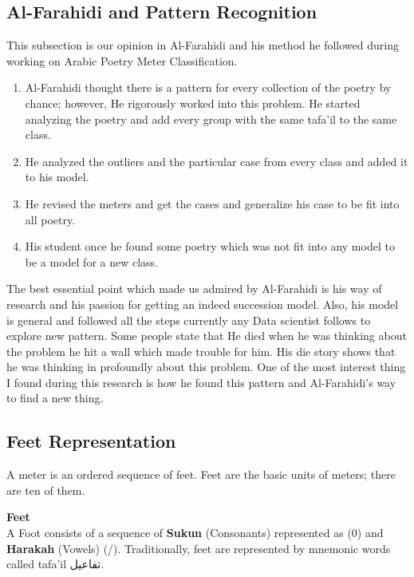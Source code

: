   

  
    
    \subsection{Al-Farahidi and Pattern Recognition}
    This subsection is our opinion in Al-Farahidi and his method he followed during working on Arabic Poetry Meter Classification.

\begin{enumerate}


\item Al-Farahidi thought there is a pattern for every collection of the poetry by chance; however, He rigorously worked into this problem. He started analyzing the poetry and add every group with the same tafa'il to the same class.
\item He analyzed the outliers and the particular case from every class and added it to his model.
\item He revised the meters and get the cases and generalize his case to be fit into all poetry.
\item His student once he found some poetry which was not fit into any model to be a model for a new class.

\end{enumerate}
The best essential point which made us admired by Al-Farahidi is his way of research and his passion for getting an indeed succession model. Also, his model is general and followed all the steps currently any Data scientist follows to explore new pattern. Some people state that He died when he was thinking about the problem he hit a wall which made trouble for him. His die story shows that he was thinking in profoundly about this problem. One of the most interest thing I found during this research is how he found this pattern and Al-Farahidi’s way to find a new thing.

    
    
    \subsection{Feet Representation}
    A meter is an ordered sequence of feet. Feet are the basic
units of meters; there are ten of them.
\begin{definition}\label{def:feet}
  \textbf{Feet} \hfill \\  A Foot consists of
a sequence of \textbf{Sukun} (Consonants) represented as (0) and \textbf{Harakah} (Vowels) (/). Traditionally, feet are represented by mnemonic words called tafa’il \textarabic{تفاعيل}.
\end{definition}

